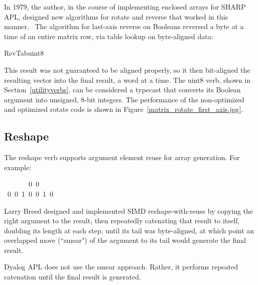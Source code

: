 \medskip

In 1979, the author, in the course of implementing enclosed arrays
for SHARP APL, designed new algorithms for rotate and
reverse that worked in this manner.~\cite{RBernecky:fastrotrev}
The algorithm for last-axis reverse on Booleans reversed a byte at a time
of an entire matrix row, via table lookup on byte-aligned data:

\medskip
{\apl RevTab\qlbr\0uint8~\qomega\qrbr}
\medskip

\noindent This result was not guaranteed to be aligned properly, so
it then bit-aligned the resulting vector into the final result, 
a word at a time. The {\apl uint8} verb, shown in Section~\ref{utilityverbs},
can be considered a typecast that 
converts its Boolean argument into unsigned, 8-bit integers. 
The performance of the non-optimized and optimized rotate code 
is shown in Figure~\ref{matrix_rotate_first_axis.jpg}.  

\subsection{Reshape}

The reshape verb supports argument element reuse for array generation. 
For example:

\medskip
{~~~~~~\qrho{}~0~0}\\
{~0~0~1~0~0~1~0}
\medskip

\noindent Larry Breed designed and implemented SIMD reshape-with-reuse 
by copying the right argument to the result,
then repeatedly catenating that result to itself, doubling its
length at each step, until its tail was byte-aligned, 
at which point an overlapped move (``smear") of the argument to 
its tail would generate the final result.~\cite{LMBreed:pc2014}

Dyalog APL does not use the smear approach. Rather, it performs
repeated catenation until the final result is generated.


